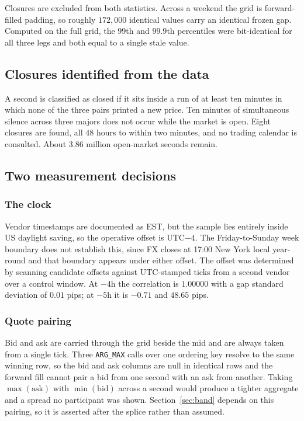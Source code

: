 \documentclass[11pt,a4paper]{article}
\newcommand{\code}[1]{\texttt{\small #1}}
\begin{document}
Closures are excluded from both statistics. Across a weekend the grid is forward-filled
padding, so roughly $172{,}000$ identical values carry an identical frozen gap. Computed on
the full grid, the $99$th and $99.9$th percentiles were bit-identical for all three legs and
both equal to a single stale value.

\subsection{Closures identified from the data}

A second is classified as closed if it sits inside a run of at least ten minutes in which
none of the three pairs printed a new price. Ten minutes of simultaneous silence across
three majors does not occur while the market is open. Eight closures are found, all $48$
hours to within two minutes, and no trading calendar is consulted. About $3.86$ million
open-market seconds remain.

\subsection{Two measurement decisions}

\subsubsection*{The clock}

Vendor timestamps are documented as EST, but the sample lies entirely inside US daylight
saving, so the operative offset is UTC$-4$. The Friday-to-Sunday week boundary does not
establish this, since FX closes at 17:00 New York local year-round and that boundary appears
under either offset. The offset was determined by scanning candidate offsets against
UTC-stamped ticks from a second vendor over a control window. At $-4$h the correlation is
$1.00000$ with a gap standard deviation of $0.01$ pips; at $-5$h it is $-0.71$ and $48.65$
pips.

\subsubsection*{Quote pairing}

Bid and ask are carried through the grid beside the mid and are always taken from a single
tick. Three \code{ARG\_MAX} calls over one ordering key resolve to the same winning row, so
the bid and ask columns are null in identical rows and the forward fill cannot pair a bid
from one second with an ask from another. Taking $\max(\text{ask})$ with $\min(\text{bid})$
across a second would produce a tighter aggregate and a spread no participant was shown.
Section~\ref{sec:band} depends on this pairing, so it is asserted after the splice rather
than assumed.
\end{document}
